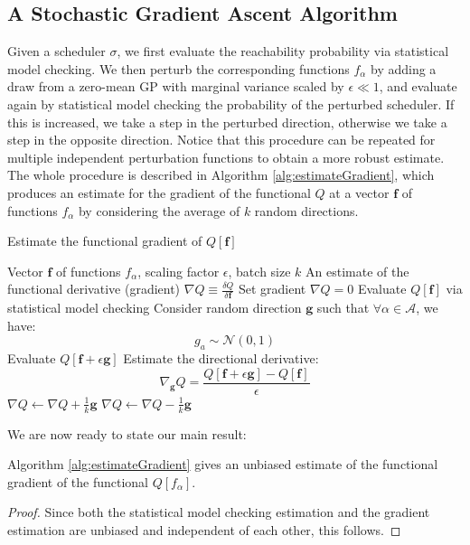 \subsection{A Stochastic Gradient Ascent Algorithm}

Given a scheduler $\sigma$, we first evaluate the reachability probability via statistical model checking. 
We then perturb the corresponding functions $f_{\alpha}$ by adding a draw from a zero-mean GP with marginal variance scaled by $\epsilon\ll 1$, and evaluate again by statistical model checking the probability of the perturbed scheduler. If this is increased, we take a step in the perturbed direction, otherwise we take a step in the opposite direction. Notice that this procedure can be repeated for multiple independent perturbation functions to obtain a more robust estimate. 
The whole procedure is described in Algorithm \ref{alg:estimateGradient}, which produces an estimate for the gradient of the functional $Q$ at a vector $\mathbf{f}$ of functions $f_{\alpha}$ by considering the average of $k$ random directions.
\begin{algorithm}[ht!]
\caption{Estimate the functional gradient of $Q[\mathbf{f}]$}
\label{alg:estimateGradient}
\begin{algorithmic}
\REQUIRE Vector $\mathbf{f}$ of functions $f_{\alpha}$, scaling factor $\epsilon$, batch size $k$
\ENSURE An estimate of the functional derivative (gradient) $\nabla Q \equiv \frac{\delta Q}{\delta \mathbf{f}}$
	\STATE Set gradient $\nabla Q = 0$
	\STATE Evaluate $Q[\mathbf{f}]$ via statistical model checking
		\STATE Consider random direction $\mathbf{g}$ such that $\forall \alpha \in \mathcal{A}$, we have:
		\[ g_a \sim \mathcal{N}(0, 1) \]
		\STATE Evaluate $Q[\mathbf{f} + \epsilon \mathbf{g}]$
		\STATE Estimate the directional derivative:
		\[ \nabla_{\mathbf{g}} Q = \frac{Q[\mathbf{f} + \epsilon \mathbf{g}] - Q[\mathbf{f}]}{\epsilon} \]
			\STATE $\nabla Q \leftarrow \nabla Q + \frac{1}{k} \mathbf{g}$
		\ELSE
			\STATE $\nabla Q \leftarrow \nabla Q - \frac{1}{k} \mathbf{g}$
		\ENDIF
	\ENDFOR
\end{algorithmic}
\end{algorithm}
We are now ready to state our main result:
\begin{theorem}
Algorithm \ref{alg:estimateGradient} gives an unbiased estimate of the functional gradient of the functional $Q[f_\alpha]$.
\end{theorem}
\begin{proof} Since both the statistical model checking estimation and the gradient estimation are unbiased and independent of each other, this follows.
\end{proof}

